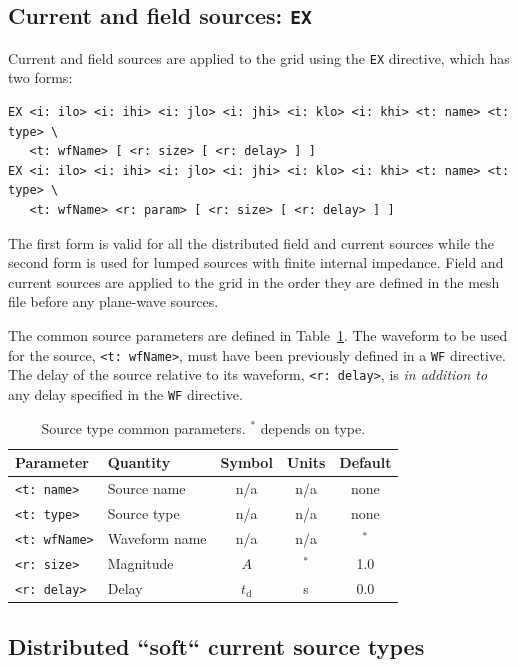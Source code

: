 \documentclass[onecolumn,a4paper]{article}
\numberwithin{equation}{section}
\begin{document}
\subsection{Current and field sources: \texttt{EX}}

Current and field sources are applied to the grid using the \texttt{EX} directive, 
which has two forms:
\begin{verbatim}
EX <i: ilo> <i: ihi> <i: jlo> <i: jhi> <i: klo> <i: khi> <t: name> <t: type> \
   <t: wfName> [ <r: size> [ <r: delay> ] ]
EX <i: ilo> <i: ihi> <i: jlo> <i: jhi> <i: klo> <i: khi> <t: name> <t: type> \
   <t: wfName> <r: param> [ <r: size> [ <r: delay> ] ]
\end{verbatim}
The first form is valid for all the distributed field and current sources while
the second form is used for lumped sources with finite internal impedance. 
Field and current sources are applied to the grid in the order they are defined
in the mesh file before any plane-wave sources.

The common source parameters are defined in Table~\ref{tb:exparm}. The waveform
to be used for the source, \texttt{<t:~wfName>}, must have been previously defined 
in a \texttt{WF} directive. The delay of the source relative to its waveform,
\texttt{<r:~delay>}, is {\em in addition to} any delay specified in the \texttt{WF} directive.

\begin{table}[ht]
\begin{center}
\begin{tabular}{|l|l|c|c|c|}
\hline
Parameter            &Quantity      &Symbol         &Units &Default \\ 
\hline
\texttt{<t:~name>}   &Source name   &n/a            &n/a   &none    \\ 
\texttt{<t:~type>}   &Source type   &n/a            &n/a   &none    \\ 
\texttt{<t:~wfName>} &Waveform name &n/a            &n/a   &$^*$    \\
\texttt{<r:~size>}   &Magnitude     &$A$            &$^*$  &1.0     \\
\texttt{<r:~delay>}  &Delay         &$t_\mathrm{d}$ &s     &0.0     \\ 
\hline
\end{tabular}
\caption{\label{tb:exparm}Source type common parameters. $^*$ depends on type.}
\end{center}
\end{table}

\subsection{Distributed ``soft`` current source types}
\end{document}

